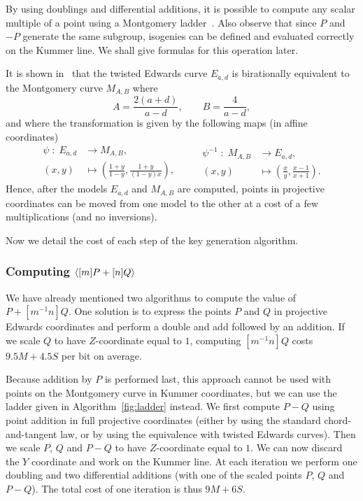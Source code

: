 By using doublings and differential additions, it is possible to
compute any scalar multiple of a point using a Montgomery
ladder~\cite{montgomery}. Also observe that since $P$ and $-P$
generate the same subgroup, isogenies can be defined and evaluated
correctly on the Kummer line. We shall give formulas for this
operation later.

It is shown in~\cite{twisted-edwards} that the twisted Edwards curve
$E_{a,d}$ is birationally equivalent to the Montgomery curve $M_{A,B}$
where
\begin{equation}
  A = \frac{2(a+d)}{a-d}, \qquad B = \frac{4}{a-d},
\end{equation}
and where the transformation is given by the following maps (in
affine coordinates)
\begin{equation}
  \label{eq:birational}
  \begin{aligned}
    \psi\;:\;E_{a,d}&\to M_{A,B},\\
    (x,y) &\mapsto \left(\frac{1+y}{1-y}, \frac{1+y}{(1-y)x}\right),
  \end{aligned}
  \qquad
  \begin{aligned}
    \psi^{-1}\;:\;M_{A,B}&\to E_{a,d},\\
    (x,y) &\mapsto \left(\frac{x}{y}, \frac{x-1}{x+1}\right).
  \end{aligned}
\end{equation}
Hence, after the models $E_{a,d}$ and $M_{A,B}$ are computed, points
in projective coordinates can be moved from one model to the other at
a cost of a few multiplications (and no inversions).

Now we detail the cost of each step of the key generation algorithm.

\subsubsection{Computing ${\langle [m]P+[n]Q \rangle}$}\label{sssec:montgomery-ladder}

We have already mentioned two algorithms to compute the value of
$P+[m^{-1}n]Q$. One solution is to express the points $P$ and $Q$ in
projective Edwards coordinates and perform a double and add followed
by an addition. If we scale $Q$ to have $Z$-coordinate equal to $1$,
computing $[m^{-1}n]Q$ costs $9.5M+4.5S$ per bit on average.

Because addition by $P$ is performed last, this approach cannot
be used with points on the Montgomery curve in Kummer coordinates, but
we can use the ladder given in Algorithm~\ref{fig:ladder} instead. We
first compute $P-Q$ using point addition in full projective
coordinates (either by using the standard chord-and-tangent law, or by
using the equivalence with twisted Edwards curves). Then we scale $P$,
$Q$ and $P-Q$ to have $Z$-coordinate equal to $1$. We can now discard
the $Y$ coordinate and work on the Kummer line. At each iteration we
perform one doubling and two differential additions (with one of the
scaled points $P$, $Q$ and $P-Q$). The total cost of one iteration is
thus $9M+6S$.

